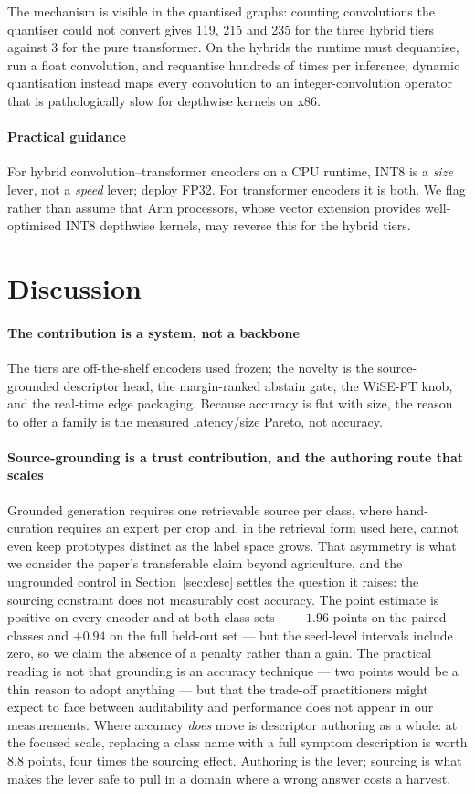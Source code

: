 \documentclass[a4paper,fleqn]{cas-dc}
\begin{document}
The mechanism is visible in the quantised graphs: counting convolutions the quantiser could not
convert gives 119, 215 and 235 for the three hybrid tiers against 3 for the pure transformer. On the
hybrids the runtime must dequantise, run a float convolution, and requantise hundreds of times per
inference; dynamic quantisation instead maps every convolution to an integer-convolution operator that
is pathologically slow for depthwise kernels on x86.

\paragraph{Practical guidance} For hybrid convolution--transformer encoders on a CPU runtime, INT8 is a
\emph{size} lever, not a \emph{speed} lever; deploy FP32. For transformer encoders it is both. We flag
rather than assume that Arm processors, whose vector extension provides well-optimised INT8 depthwise
kernels, may reverse this for the hybrid tiers.

\section{Discussion}

\paragraph{The contribution is a system, not a backbone} The tiers are off-the-shelf encoders used
frozen; the novelty is the source-grounded descriptor head, the margin-ranked abstain gate, the WiSE-FT
knob, and the real-time edge packaging. Because accuracy is flat with size, the reason to offer a
family is the measured latency/size Pareto, not accuracy.

\paragraph{Source-grounding is a trust contribution, and the authoring route that scales} Grounded
generation requires one retrievable source per class, where hand-curation requires an expert per crop
and, in the retrieval form used here, cannot even keep prototypes distinct as the label space grows.
That asymmetry is what we consider the paper's transferable claim beyond agriculture, and the
ungrounded control in Section~\ref{sec:desc} settles the question it raises: the sourcing constraint
does not measurably cost accuracy. The point estimate is positive on every encoder and at both class
sets --- $+1.96$ points on the paired classes and $+0.94$ on the full held-out set --- but the
seed-level intervals include zero, so we claim the absence of a penalty rather than a gain. The practical reading is not that grounding is an accuracy technique --- two
points would be a thin reason to adopt anything --- but that the trade-off practitioners might expect
to face between auditability and performance does not appear in our measurements. Where accuracy
\emph{does} move is descriptor authoring as a whole: at the focused scale, replacing a class name
with a full symptom description is worth 8.8 points, four times the sourcing effect. Authoring is the
lever; sourcing is what makes the lever safe to pull in a domain where a wrong answer costs a
harvest.
\end{document}
